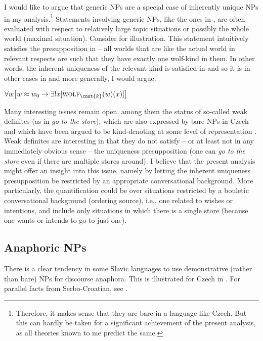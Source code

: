 \documentclass[output=paper,colorlinks,citecolor=brown,newtxmath]{langscibook}
\begin{document}
\noindent I would like to argue that generic NPs are a special case of inherently unique NPs in my analysis.\footnote{Therefore, it makes sense that they are bare in a language like Czech. But this can hardly be taken for a significant achievement of the present analysis, as all theories known to me predict the same.} Statements involving generic NPs, like the ones in , are often evaluated with respect to relatively large topic situations or possibly the whole world (maximal situation). Consider  for illustration. This statement intuitively satisfies the presupposition in  -- all worlds that are like the actual world in relevant respects are such that they have exactly one wolf-kind in them. In other words, the inherent uniqueness of the relevant kind is satisfied in  and so it is in other cases in  and more generally, I would argue.

\ea $\forall w\big[w\approx w_0\rightarrow\exists!x[\textsc{wolf}_{\cnst{k}}(w)(x)]\big]$\label{simik:ex:wolf}
\z

\noindent Many interesting issues remain open, among them the status of so-called weak definites (as in \textit{go to the store}), which are also expressed by bare NPs in Czech and which have been argued to be kind-denoting at some level of representation \citep{Aguilar-Guevara.Zwarts2011}. Weak definites are interesting in that they do not satisfy -- or at least not in any immediately obvious sense -- the uniqueness presupposition (one can \textit{go to the store} even if there are multiple stores around). I believe that the present analysis might offer an insight into this issue, namely by letting the inherent uniqueness presupposition be restricted by an appropriate conversational background. More particularly, the quantification could be over situations restricted by a bouletic conversational background (ordering source), i.e., one related to wishes or intentions, and include only situations in which there is a single store (because one wants or intends to go to just one).

\subsection{Anaphoric NPs}

There is a clear tendency in some Slavic languages to use demonstrative (rather than bare) NPs for discourse anaphora. This is illustrated for Czech in . For parallel facts from Serbo-Croatian, see \citet{Arsenijevic2018}.
\end{document}

